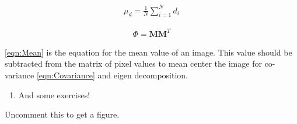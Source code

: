 \documentclass{tufte-handout}
\newcommand{\x}{\mathbf{x}}
\begin{document}
\begin{align}
 \mu_{d} = \frac{1}{N} \sum_{i=1}^{N} d_{i} \label{eqn:Mean}
\end{align}

\begin{align}
\Phi = \mathbf{MM}^{T} \label{eqn:Covariance}
\end{align}

\eqref{eqn:Mean} is the equation for the mean value of an image. This value should be subtracted from the matrix of pixel values to mean center the image for co-variance \eqref{eqn:Covariance} and eigen decomposition.




\begin{enumerate}[resume]
\item And some exercises!
\end{enumerate}




Uncomment this to get a figure.


\end{document}
